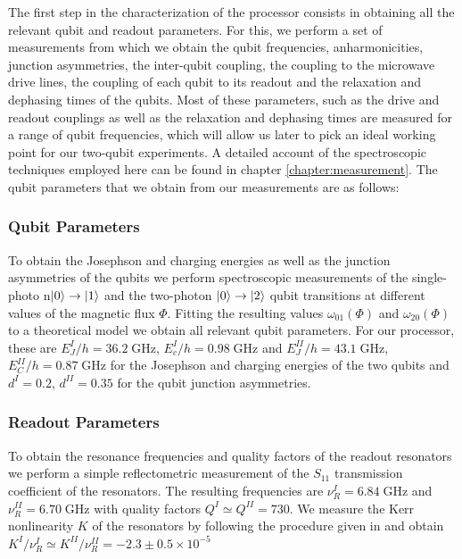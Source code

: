 The first step in the characterization of the processor consists in obtaining all the relevant qubit and readout parameters. For this, we perform a set of measurements from which we obtain the qubit frequencies, anharmonicities, junction asymmetries, the inter-qubit coupling, the coupling to the microwave drive lines, the coupling of each qubit to its readout and the relaxation and dephasing times of the qubits. Most of these parameters, such as the drive and readout couplings as well as the relaxation and dephasing times are measured for a range of qubit frequencies, which will allow us later to pick an ideal working point for our two-qubit experiments. A detailed account of the spectroscopic techniques employed here can be found in chapter \ref{chapter:measurement}. The qubit parameters that we obtain from our measurements are as follows:

\subsubsection{Qubit Parameters}

To obtain the Josephson and charging energies as well as the junction asymmetries of the qubits we perform spectroscopic measurements of the single-photo n$\left| 0 \right>\to \left| 1 \right>$ and the two-photon $\left| 0 \right>\to\left| 2 \right>$ qubit transitions at different values of the magnetic flux $\Phi$. Fitting the resulting values $\omega_{01}(\Phi)$ and $\omega_{20}(\Phi)$ to a theoretical model we obtain all relevant qubit parameters. For our processor, these are $E_J^I / h = 36.2\; \mathrm{GHz}$, $E_c^I / h = 0.98 \; \mathrm{GHz}$ and $E_J^{II} / h = 43.1\; \mathrm{GHz}$, $E_C^{II} / h = 0.87 \; \mathrm{GHz}$ for the Josephson and charging energies of the two qubits and $d^I = 0.2$, $d^{II} =  0.35$ for the qubit junction asymmetries.

\subsubsection{Readout Parameters}

To obtain the resonance frequencies and quality factors of the readout resonators we perform a simple reflectometric measurement of the $S_{11}$ transmission coefficient of the resonators. The resulting frequencies are $\nu_R^I = 6.84 \; \mathrm{GHz}$ and $\nu_R^{II} = 6.70 \; \mathrm{GHz}$ with quality factors $Q^I \simeq Q^{II} = 730$. We measure the Kerr nonlinearity $K$ of the resonators by following the procedure given in \citep[p. 166]{palacios-laloy_superconducting_2010} and obtain $K^I / \nu_R^I \simeq K^{II} / \nu_R^{II} = -2.3\pm 0.5 \times 10^{-5}$ 

